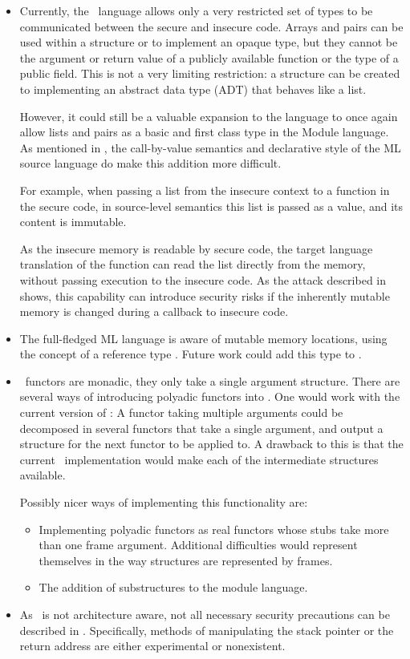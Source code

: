 \begin{itemize}
\item
Currently, the \MiniML\ language allows only a very restricted set of types to be communicated between the secure and insecure code. 
Arrays and pairs can be used within a structure or to implement an opaque type, but they cannot be the argument or return value of a publicly available function or the type of a public field.
This is not a very limiting restriction: a structure can be created to implementing an abstract data type (ADT) that behaves like a list.

However, it could still be a valuable expansion to the language to once again allow lists and pairs as a basic and first class type in the Module language.
As mentioned in , the call-by-value semantics and declarative style of the ML source language do make this addition more difficult.

For example, when passing a list from the insecure context to a function in the secure code, in source-level semantics this list is passed as a value, and its content is immutable.

As the insecure memory is readable by secure code, the target language translation of the function can read the list directly from the memory, without passing execution to the insecure code.
As the attack described in  shows, this capability can introduce security risks if the inherently mutable  memory is changed during a callback to insecure code.
\item
The full-fledged ML language is aware of mutable memory locations, using the concept of a reference type .
Future work could add this type to \MiniML.

\item
\MiniML\ functors are monadic, they only take a single argument structure.
There are several ways of introducing polyadic functors into \MiniML.
One would work with the current version of \MiniML:
A functor taking multiple arguments could be decomposed in several functors that take a single argument, and output a structure for the next functor to be applied to. 
A drawback to this is that the current \MiniML\ implementation would make each of the intermediate structures available.

Possibly nicer ways of implementing this functionality are:
\begin{itemize}
\item Implementing polyadic functors as real functors whose stubs take more than one frame argument.
Additional difficulties would represent themselves in the way structures are represented by frames.
\item The addition of substructures to the module language.
\end{itemize}
\item
As \LLVMIR\ is not architecture aware, not all necessary security precautions can be described in \LLVMIR.
Specifically, methods of manipulating the stack pointer or the return address are either experimental or nonexistent.


\end{itemize}
